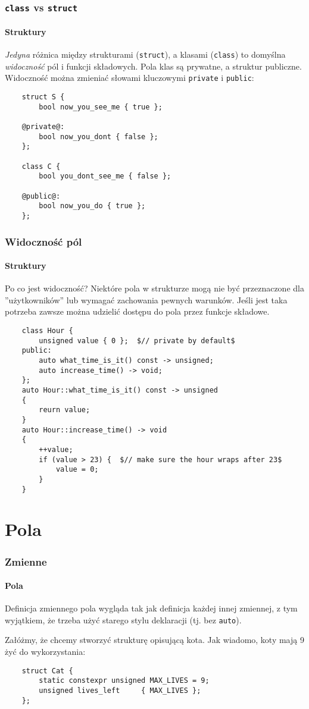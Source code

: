 \documentclass[aspectratio=169,10pt]{beamer}
\begin{document}
\begin{frame}[fragile]
    \frametitle{{\tt class} vs {\tt struct}}
    \framesubtitle{Struktury}

    \emph{Jedyna} różnica między strukturami (\texttt{struct}), a klasami
    (\texttt{class}) to domyślna \emph{widoczność} pól i funkcji składowych.
    Pola klas są prywatne, a struktur publiczne.
    Widoczność można zmieniać słowami kluczowymi {\tt private} i {\tt public}:

    {\scriptsize
    \begin{lstlisting}
    struct S {
        bool now_you_see_me { true };

    @private@:
        bool now_you_dont { false };
    };

    class C {
        bool you_dont_see_me { false };

    @public@:
        bool now_you_do { true };
    };
    \end{lstlisting}}
\end{frame}

\begin{frame}[fragile]
    \frametitle{Widoczność pól}
    \framesubtitle{Struktury}

    Po co jest widoczność? Niektóre pola w strukturze mogą nie być przeznaczone
    dla ''użytkowników'' lub wymagać zachowania pewnych warunków. Jeśli jest
    taka potrzeba zawsze można udzielić dostępu do pola przez funkcje składowe.

    {\tiny
    \begin{lstlisting}
    class Hour {
        unsigned value { 0 };  $// private by default$
    public:
        auto what_time_is_it() const -> unsigned;
        auto increase_time() -> void;
    };
    auto Hour::what_time_is_it() const -> unsigned
    {
        reurn value;
    }
    auto Hour::increase_time() -> void
    {
        ++value;
        if (value > 23) {  $// make sure the hour wraps after 23$
            value = 0;
        }
    }
    \end{lstlisting}}
\end{frame}

\section{Pola}

\begin{frame}[fragile]
    \frametitle{Zmienne}
    \framesubtitle{Pola}

    Definicja zmiennego pola wygląda tak jak definicja każdej innej zmiennej, z
    tym wyjątkiem, że trzeba użyć starego stylu deklaracji (tj. bez
    \texttt{auto}).

    Załóżmy, że chcemy stworzyć strukturę opisującą kota. Jak wiadomo, koty mają
    9 żyć do wykorzystania:

    {\small
    \begin{lstlisting}
    struct Cat {
        static constexpr unsigned MAX_LIVES = 9;
        unsigned lives_left     { MAX_LIVES };
    };
    \end{lstlisting}}
\end{frame}
\end{document}
